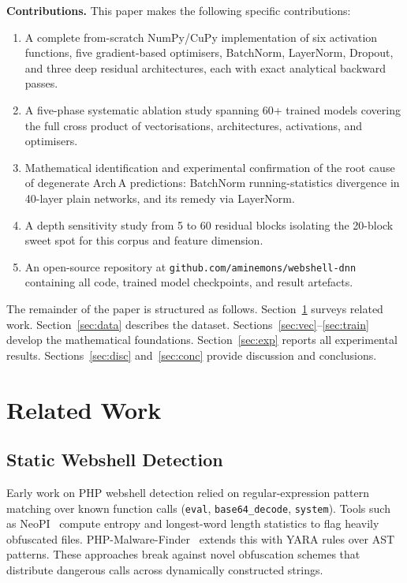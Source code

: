 \documentclass[10pt,conference,letterpaper]{IEEEtran}
\begin{document}
\textbf{Contributions.} This paper makes the following specific contributions:
\begin{enumerate}
  \item A complete from-scratch NumPy/CuPy implementation of six activation
        functions, five gradient-based optimisers, BatchNorm, LayerNorm,
        Dropout, and three deep residual architectures, each with exact
        analytical backward passes.
  \item A five-phase systematic ablation study spanning 60+ trained models
        covering the full cross product of vectorisations, architectures,
        activations, and optimisers.
  \item Mathematical identification and experimental confirmation of the root
        cause of degenerate Arch\,A predictions: BatchNorm running-statistics
        divergence in 40-layer plain networks, and its remedy via LayerNorm.
  \item A depth sensitivity study from 5 to 60 residual blocks isolating the
        20-block sweet spot for this corpus and feature dimension.
  \item An open-source repository at
        \texttt{github.com/aminemons/webshell-dnn} containing all
        code, trained model checkpoints, and result artefacts.
\end{enumerate}

The remainder of the paper is structured as follows. Section~\ref{sec:related}
surveys related work. Section~\ref{sec:data} describes the dataset.
Sections~\ref{sec:vec}--\ref{sec:train} develop the mathematical foundations.
Section~\ref{sec:exp} reports all experimental results.
Sections~\ref{sec:disc} and~\ref{sec:conc} provide discussion and conclusions.

\section{Related Work}
\label{sec:related}

\subsection{Static Webshell Detection}

Early work on PHP webshell detection relied on regular-expression pattern matching
over known function calls (\texttt{eval}, \texttt{base64\_decode},
\texttt{system}). Tools such as NeoPI~\cite{neopi} compute entropy and
longest-word length statistics to flag heavily obfuscated files.
PHP-Malware-Finder~\cite{phpmf} extends this with YARA rules over AST patterns.
These approaches break against novel obfuscation schemes that distribute dangerous
calls across dynamically constructed strings.
\end{document}
